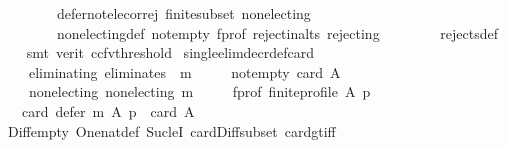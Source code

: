 \begin{isabellebody}
\ \ \ \ \ \ \ \ defer{\isacharunderscore}{\kern0pt}not{\isacharunderscore}{\kern0pt}elec{\isacharunderscore}{\kern0pt}or{\isacharunderscore}{\kern0pt}rej\ finite{\isacharunderscore}{\kern0pt}subset\ non{\isacharunderscore}{\kern0pt}electing\isanewline
\ \ \ \ \ \ \ \ non{\isacharunderscore}{\kern0pt}electing{\isacharunderscore}{\kern0pt}def\ not{\isacharunderscore}{\kern0pt}empty\ f{\isacharunderscore}{\kern0pt}prof\ reject{\isacharunderscore}{\kern0pt}in{\isacharunderscore}{\kern0pt}alts\ rejecting\isanewline
\ \ \ \ \ \ \ \ rejects{\isacharunderscore}{\kern0pt}def\isanewline
\ \ \isamarkupfalse%
\ {\isacharparenleft}{\kern0pt}smt\ {\isacharparenleft}{\kern0pt}verit{\isacharcomma}{\kern0pt}\ ccfv{\isacharunderscore}{\kern0pt}threshold{\isacharparenright}{\kern0pt}{\isacharparenright}{\kern0pt}%
\endisatagproof
{\isafoldproof}%
%
\isadelimproof
\isanewline
%
\endisadelimproof
\isanewline
{}\isamarkupfalse%
\ single{\isacharunderscore}{\kern0pt}elim{\isacharunderscore}{\kern0pt}decr{\isacharunderscore}{\kern0pt}def{\isacharunderscore}{\kern0pt}card{}{\isacharcolon}{\kern0pt}\isanewline
\ \ \isanewline
\ \ \ \ eliminating{\isacharcolon}{\kern0pt}\ {\isachardoublequoteopen}eliminates\ {}\ m{\isachardoublequoteclose}\ \isanewline
\ \ \ \ not{\isacharunderscore}{\kern0pt}empty{\isacharcolon}{\kern0pt}\ {\isachardoublequoteopen}card\ A\ {\isachargreater}{\kern0pt}\ {}{\isachardoublequoteclose}\ \isanewline
\ \ \ \ non{\isacharunderscore}{\kern0pt}electing{\isacharcolon}{\kern0pt}\ {\isachardoublequoteopen}non{\isacharunderscore}{\kern0pt}electing\ m{\isachardoublequoteclose}\ \isanewline
\ \ \ \ f{\isacharunderscore}{\kern0pt}prof{\isacharcolon}{\kern0pt}\ {\isachardoublequoteopen}finite{\isacharunderscore}{\kern0pt}profile\ A\ p{\isachardoublequoteclose}\isanewline
\ \ \ {\isachardoublequoteopen}card\ {\isacharparenleft}{\kern0pt}defer\ m\ A\ p{\isacharparenright}{\kern0pt}\ {\isacharequal}{\kern0pt}\ card\ A\ {\isacharminus}{\kern0pt}\ {}{\isachardoublequoteclose}\isanewline
%
\isadelimproof
\ \ %
\endisadelimproof
%
\isatagproof
{}\isamarkupfalse%
\ Diff{\isacharunderscore}{\kern0pt}empty\ One{\isacharunderscore}{\kern0pt}nat{\isacharunderscore}{\kern0pt}def\ Suc{\isacharunderscore}{\kern0pt}leI\ card{\isacharunderscore}{\kern0pt}Diff{\isacharunderscore}{\kern0pt}subset\ card{\isacharunderscore}{\kern0pt}gt{\isacharunderscore}{\kern0pt}{}{\isacharunderscore}{\kern0pt}iff\isanewline

\end{isabellebody}
